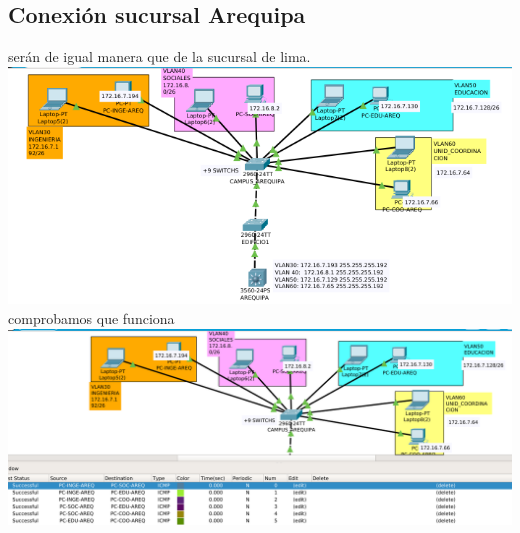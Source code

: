 \subsection{Conexi\'on sucursal Arequipa}
ser\'an de igual manera que de la sucursal de lima.
\\
\includegraphics[scale=0.45]{img/VLANAREQUIPA.png} 
\\comprobamos que funciona
\\
\includegraphics[scale=0.4]{img/arequipasucess.png} 

